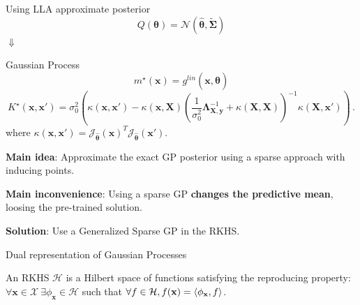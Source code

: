 \documentclass[aspectratio=149]{beamer}
\begin{document}
    \begin{frame}
        \begin{center}
        Using LLA approximate posterior 
            \[
                Q(\bm{\theta}) = \mathcal{N}(\hat{\bm{\theta}},\tilde{\bm{\Sigma}})
            \]
            $\Downarrow$
            
            Gaussian Process
            \[
                m^\star(\mathbf x) = g^{lin}(\mathbf x, \hat{\bm{\theta}})
            \]
            \[
                K^\star(\mathbf x, \mathbf x') = \sigma_0^2\left( \kappa(\mathbf{x}, \mathbf{x}') - \kappa(\mathbf{x}, \mathbf{X})\left(  \frac{1}{\sigma_0^2} \bm{\Lambda}_{\mathbf{X}, \mathbf{y}}^{-1} + \kappa(\mathbf{X}, \mathbf{X}) \right)^{-1} \kappa(\mathbf{X}, \mathbf{x}' )\right)\,.
            \]
            where \(\kappa(\mathbf{x}, \mathbf{x}') = \mathcal{J}_{\hat{\bm{\theta}}}(\mathbf{x})^T\mathcal{J}_{\hat{\bm{\theta}}}(\mathbf{x}' )\).
        \end{center}
    \end{frame}

    \begin{frame}
        \textbf{Main idea}: Approximate the exact GP posterior using a sparse approach with inducing points.

        \textbf{Main inconvenience}: Using a sparse GP \textbf{changes the predictive mean}, loosing the pre-trained solution.

        \textbf{Solution}: Use a Generalized Sparse GP in the RKHS.
    \end{frame}

    \begin{frame}{Dual representation of Gaussian Processes}

        An RKHS \(\mathcal{H}\) is a Hilbert space of functions satisfying the reproducing property: \(\forall \mathbf{x} \in \mathcal{X} \ \exists \phi_{\mathbf{x}} \in \mathcal{H}\) such that \(\forall f \in \mathcal{H}, f(\mathbf{x}) = \braket{\phi_{\mathbf{x}}, f} \).

    \end{frame}
\end{document}
